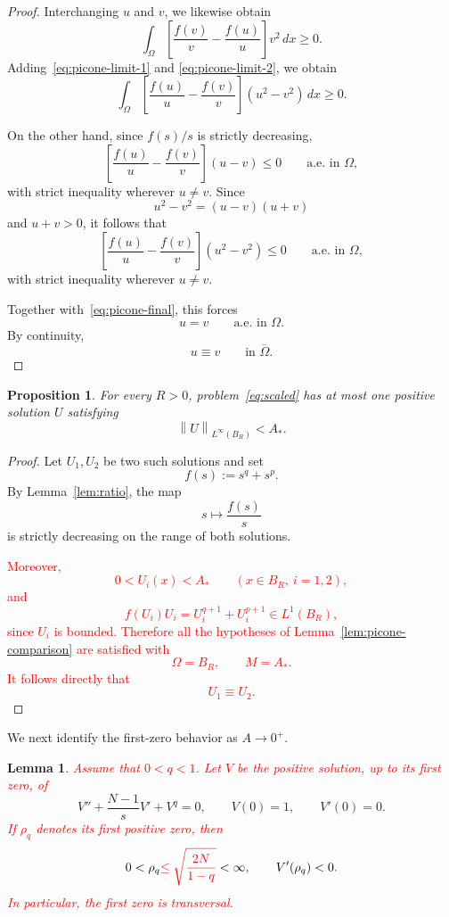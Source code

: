 \documentclass[11pt]{article}
\newcommand{\norm}[1]{\left\|#1\right\|}
\newtheorem{proposition}[theorem]{Proposition}
\newtheorem{lemma}[theorem]{Lemma}
\theoremstyle{definition}
\begin{document}
\begin{proof}
Interchanging $u$ and $v$, we likewise obtain
\begin{equation}
\label{eq:picone-limit-2}
\int_\Omega
\left[
\frac{f(v)}{v}
-
\frac{f(u)}{u}
\right]v^2\,dx
\geq0.
\end{equation}
Adding~\eqref{eq:picone-limit-1} and
\eqref{eq:picone-limit-2}, we obtain
\begin{equation}
\label{eq:picone-final}
\int_\Omega
\left[
\frac{f(u)}{u}
-
\frac{f(v)}{v}
\right]
(u^2-v^2)\,dx
\geq0.
\end{equation}

On the other hand, since $f(s)/s$ is strictly decreasing,
\[
\left[
\frac{f(u)}{u}
-
\frac{f(v)}{v}
\right](u-v)\leq0
\qquad\text{a.e. in }\Omega,
\]
with strict inequality wherever $u\neq v$. Since
\[
u^2-v^2=(u-v)(u+v)
\]
and $u+v>0$, it follows that
\[
\left[
\frac{f(u)}{u}
-
\frac{f(v)}{v}
\right]
(u^2-v^2)
\leq0
\qquad\text{a.e. in }\Omega,
\]
with strict inequality wherever $u\neq v$.

Together with~\eqref{eq:picone-final}, this forces
\[
u=v
\qquad\text{a.e. in }\Omega.
\]
By continuity,
\[
u\equiv v
\qquad\text{in }\overline\Omega.
\]
\end{proof}



\begin{proposition}
\label{prop:smalluniqueness}
For every $R>0$, problem~\eqref{eq:scaled} has at most one positive
solution $U$ satisfying
\[
\norm{U}_{L^\infty(B_R)}<A_*.
\]
\end{proposition}

\begin{proof}
Let $U_1,U_2$ be two such solutions and set
\[
f(s):=s^q+s^p.
\]
By Lemma~\ref{lem:ratio}, the map
\[
s\longmapsto \frac{f(s)}{s}
\]
is strictly decreasing on the range of both solutions.

\textcolor{red}{
Moreover,
\[
0<U_i(x)<A_*
\qquad
(x\in B_R,\ i=1,2),
\]
and
\[
f(U_i)U_i
=
U_i^{q+1}+U_i^{p+1}\in L^1(B_R),
\]
since $U_i$ is bounded. Therefore all the hypotheses of
Lemma~\ref{lem:picone-comparison} are satisfied with
\[
\Omega=B_R,
\qquad
M=A_*.
\]
It follows directly that
\[
U_1\equiv U_2.
\]
}
\end{proof}





We next identify the first-zero behavior as $A\to0^+$.

\begin{lemma}
\label{lem:rhoq}
\textcolor{red}{Assume that $0<q<1$. Let $V$ be the positive solution,
up to its first zero, of}
\begin{equation}
\label{eq:pureconcave}
V''
+\frac{N-1}{s}V'
+V^q
=0,
\qquad
V(0)=1,
\qquad
V'(0)=0.
\end{equation}
\textcolor{red}{If $\rho_q$ denotes its first positive zero, then}
\[
0<\rho_q\textcolor{red}{\leq
\sqrt{\frac{2N}{1-q}}}<\infty,
\qquad
V'(\rho_q)<0.
\]
\textcolor{red}{In particular, the first zero is transversal.}
\end{lemma}
\end{document}

